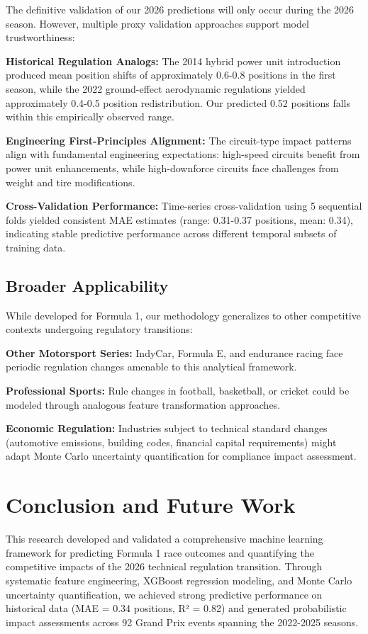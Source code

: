 \documentclass[conference]{IEEEtran}
\begin{document}
The definitive validation of our 2026 predictions will only occur during the 2026 season. However, multiple proxy validation approaches support model trustworthiness:

\textbf{Historical Regulation Analogs:} The 2014 hybrid power unit introduction produced mean position shifts of approximately 0.6-0.8 positions in the first season, while the 2022 ground-effect aerodynamic regulations yielded approximately 0.4-0.5 position redistribution. Our predicted 0.52 positions falls within this empirically observed range.

\textbf{Engineering First-Principles Alignment:} The circuit-type impact patterns align with fundamental engineering expectations: high-speed circuits benefit from power unit enhancements, while high-downforce circuits face challenges from weight and tire modifications.

\textbf{Cross-Validation Performance:} Time-series cross-validation using 5 sequential folds yielded consistent MAE estimates (range: 0.31-0.37 positions, mean: 0.34), indicating stable predictive performance across different temporal subsets of training data.

\subsection{Broader Applicability}

While developed for Formula 1, our methodology generalizes to other competitive contexts undergoing regulatory transitions:

\textbf{Other Motorsport Series:} IndyCar, Formula E, and endurance racing face periodic regulation changes amenable to this analytical framework.

\textbf{Professional Sports:} Rule changes in football, basketball, or cricket could be modeled through analogous feature transformation approaches.

\textbf{Economic Regulation:} Industries subject to technical standard changes (automotive emissions, building codes, financial capital requirements) might adapt Monte Carlo uncertainty quantification for compliance impact assessment.

\section{Conclusion and Future Work}

This research developed and validated a comprehensive machine learning framework for predicting Formula 1 race outcomes and quantifying the competitive impacts of the 2026 technical regulation transition. Through systematic feature engineering, XGBoost regression modeling, and Monte Carlo uncertainty quantification, we achieved strong predictive performance on historical data (MAE = 0.34 positions, R² = 0.82) and generated probabilistic impact assessments across 92 Grand Prix events spanning the 2022-2025 seasons.
\end{document}
